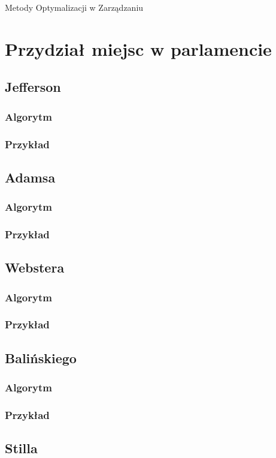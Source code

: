 \documentclass[12pt,a4paper]{article}
\begin{document}
\lstset{language=Pascal}
Metody Optymalizacji w Zarządzaniu
\newpage
\tableofcontents
\section{Przydział miejsc w parlamencie}
\subsection{Jefferson}
\subsubsection{Algorytm}
\subsubsection{Przykład}
\subsection{Adamsa}
\subsubsection{Algorytm}
\subsubsection{Przykład}
\subsection{Webstera}
\subsubsection{Algorytm}
\subsubsection{Przykład}
\subsection{Balińskiego}
\subsubsection{Algorytm}
\subsubsection{Przykład}
\subsection{Stilla}
\end{document}
